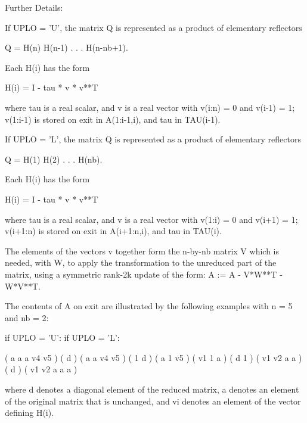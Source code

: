 \begin{DoxyParagraph}{Further Details\+: }
\begin{DoxyVerb}  If UPLO = 'U', the matrix Q is represented as a product of elementary
  reflectors

     Q = H(n) H(n-1) . . . H(n-nb+1).

  Each H(i) has the form

     H(i) = I - tau * v * v**T

  where tau is a real scalar, and v is a real vector with
  v(i:n) = 0 and v(i-1) = 1; v(1:i-1) is stored on exit in A(1:i-1,i),
  and tau in TAU(i-1).

  If UPLO = 'L', the matrix Q is represented as a product of elementary
  reflectors

     Q = H(1) H(2) . . . H(nb).

  Each H(i) has the form

     H(i) = I - tau * v * v**T

  where tau is a real scalar, and v is a real vector with
  v(1:i) = 0 and v(i+1) = 1; v(i+1:n) is stored on exit in A(i+1:n,i),
  and tau in TAU(i).

  The elements of the vectors v together form the n-by-nb matrix V
  which is needed, with W, to apply the transformation to the unreduced
  part of the matrix, using a symmetric rank-2k update of the form:
  A := A - V*W**T - W*V**T.

  The contents of A on exit are illustrated by the following examples
  with n = 5 and nb = 2:

  if UPLO = 'U':                       if UPLO = 'L':

    (  a   a   a   v4  v5 )              (  d                  )
    (      a   a   v4  v5 )              (  1   d              )
    (          a   1   v5 )              (  v1  1   a          )
    (              d   1  )              (  v1  v2  a   a      )
    (                  d  )              (  v1  v2  a   a   a  )

  where d denotes a diagonal element of the reduced matrix, a denotes
  an element of the original matrix that is unchanged, and vi denotes
  an element of the vector defining H(i).\end{DoxyVerb}
 
\end{DoxyParagraph}
